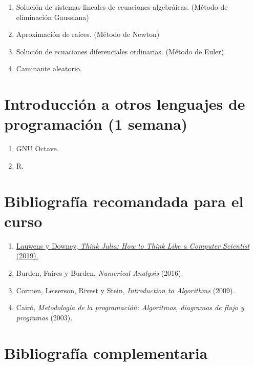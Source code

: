 \documentclass[a4paper]{article}
\begin{document}
\begin{enumerate}[label=\arabic*.]

    \item Solución de sistemas lineales de ecuaciones algebráicas. (Método de eliminación Gaussiana)
    \item Aproximación de raíces. (Método de Newton)
    \item Solución de ecuaciones diferenciales ordinarias. (Método de Euler)
    \item Caminante aleatorio.
\end{enumerate}

\section{Introducción a otros lenguajes de programación (1 semana)} \label{Sec: Introducción a otros lenguajes de programación (1 semana)}

\begin{enumerate}[label=\arabic*.]

    \item GNU Octave.
    \item R.
\end{enumerate}

\section*{Bibliografía recomandada para el curso} \label{Sec: Bibliografía}

\begin{enumerate}

    \item \href{https://benlauwens.github.io/ThinkJulia.jl/latest/book.html}{Lauwens y Downey, \emph{Think Julia: How to Think Like a Computer Scientist} (2019).}

    \item Burden, Faires y Burden, \emph{Numerical Analysis} (2016).

    \item Cormen, Leiserson, Rivest y Stein, \emph{Introduction to Algorithms} (2009).

    \item Cairó, \emph{Metodología de la programacióñ: Algoritmos, diagramas de flujo y programas} (2003).
\end{enumerate}

\section*{Bibliografía complementaria} \label{Sec: Bibliografía complementaria}
\end{document}
